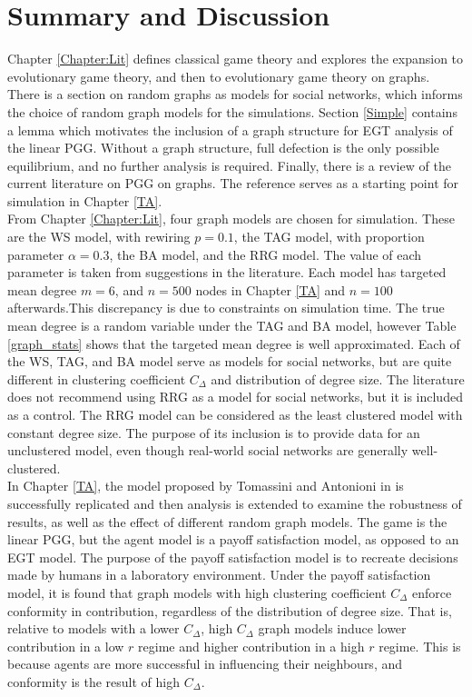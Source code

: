 \section{Summary and Discussion} 
Chapter \ref{Chapter:Lit} defines classical game theory and explores the expansion to evolutionary game theory, and then to evolutionary game theory on graphs. There is a section on random graphs as models for social networks, which informs the choice of random graph models for the simulations. Section \ref{Simple} contains a lemma which motivates the inclusion of a graph structure for EGT analysis of the linear PGG. Without a graph structure, full defection is the only possible equilibrium, and no further analysis is required. Finally, there is a review of the current literature on PGG on graphs. The reference \cite{RN49} serves as a starting point for simulation in Chapter \ref{TA}. \\

From Chapter \ref{Chapter:Lit}, four graph models are chosen for simulation. These are the WS model, with rewiring $p=0.1$, the TAG model, with proportion parameter $\alpha=0.3$, the BA model, and the RRG model. The value of each parameter is taken from suggestions in the literature. Each model has targeted mean degree $m=6$, and $n=500$ nodes in Chapter \ref{TA} and $n=100$ afterwards.This discrepancy is due to constraints on simulation time. The true mean degree is a random variable under the TAG and BA model, however Table \ref{graph_stats} shows that the targeted mean degree is well approximated. Each of the WS, TAG, and BA model serve as models for social networks, but are quite different in clustering coefficient $C_\Delta$ and distribution of degree size. The literature does not recommend using RRG as a model for social networks, but it is included as a control. The RRG model can be considered as the least clustered model with constant degree size. The purpose of its inclusion is to provide data for an unclustered model, even though real-world social networks are generally well-clustered. \\


In Chapter \ref{TA}, the model proposed by Tomassini and Antonioni in \cite{RN49} is successfully replicated and then analysis is extended to examine the robustness of results, as well as the effect of different random graph models. The game is the linear PGG, but the agent model is a payoff satisfaction model, as opposed to an EGT model. The purpose of the payoff satisfaction model is to recreate decisions made by humans in a laboratory environment. Under the payoff satisfaction model, it is found that graph models with high clustering coefficient $C_\Delta$ enforce conformity in contribution, regardless of the distribution of degree size. That is, relative to models with a lower $C_\Delta$, high $C_\Delta$ graph models induce lower contribution in a low $r$ regime and higher contribution in a high $r$ regime. This is because agents are more successful in influencing their neighbours, and conformity is the result of high $C_\Delta$. \\

